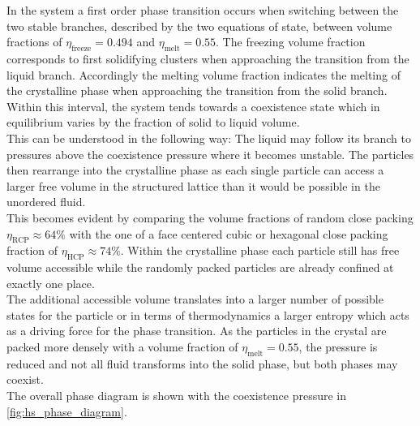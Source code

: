 In the system a first order phase transition occurs when switching between the two stable branches, described by the two equations of state, between volume fractions of $\eta_{\text{freeze}} = 0.494$ and $\eta_{\text{melt}}=0.55$. The freezing volume fraction corresponds to first solidifying clusters when approaching the transition from the liquid branch. Accordingly the melting volume fraction indicates the melting of the crystalline phase when approaching the transition from the solid branch. Within this interval, the system tends towards a coexistence state which in equilibrium varies by the fraction of solid to liquid volume.\\
This can be understood in the following way: The liquid may follow its branch to pressures above the coexistence pressure where it becomes unstable. The particles then rearrange into the crystalline phase as each single particle can access a larger free volume in the structured lattice than it would be possible in the unordered fluid.\\
This becomes evident by comparing the volume fractions of random close packing $\eta_{\text{RCP}}\approx 64\%$ with the one of a face centered cubic or hexagonal close packing fraction of $\eta_{\text{HCP}} \approx 74 \%$. Within the crystalline phase each particle still has free volume accessible while the randomly packed particles are already confined at exactly one place.\\
The additional accessible volume translates into a larger number of possible states for the particle or in terms of thermodynamics a larger entropy which acts as a driving force for the phase transition. As the particles in the crystal are packed more densely with a volume fraction of $\eta_{\text{melt}}=0.55$, the pressure is reduced and not all fluid transforms into the solid phase, but both phases may coexist.\\

The overall phase diagram is shown with the coexistence pressure in \autoref{fig:hs_phase_diagram}.\\

